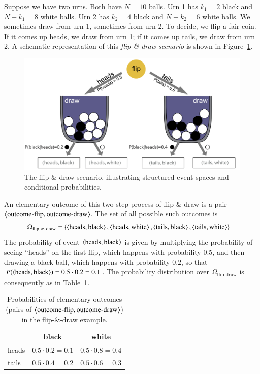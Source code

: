 \documentclass[nobib,nofonts]{tufte-handout}
\newcommand{\mult}{\ensuremath{\cdot}}
\begin{document}
Suppose we have two urns. Both have $N=10$ balls. Urn 1 has $k_1=2$ black and $N-k_1 = 8$ white
balls. Urn 2 has $k_2=4$ black and $N-k_2=6$ white balls. We sometimes draw from urn 1,
sometimes from urn 2. To decide, we flip a fair coin. If it comes up heads, we draw from urn 1;
if it comes up tails, we draw from urn 2.
A schematic representation of this \emph{flip-\&-draw scenario} is shown in Figure~\ref{fig:flip-draw}.

\begin{figure}
  \includegraphics[width=1.0\textwidth]{00-pics/05-03-flip-draw.png}
  \caption{The flip-\&-draw scenario, illustrating structured event spaces and conditional probabilities.}
  \label{fig:flip-draw}
\end{figure}

An elementary outcome of this two-step process of flip-\&-draw is a pair
$\left \langle \text{outcome-flip}, \text{outcome-draw}\right\rangle$.
The set of all possible such outcomes is
\begin{align*}
\Omega_{\text{flip-\&-draw}} & = \left\{\left \langle \text{heads}, \text{black}\right\rangle, \left \langle \text{heads},
    \text{white}\right\rangle, \left \langle \text{tails}, \text{black}\right\rangle, \left \langle \text{tails},
    \text{white}\right\rangle\right\}
\end{align*}
The probability of event $\left \langle \text{heads}, \text{black}\right\rangle$ is given by
multiplying the probability of seeing ``heads'' on the first flip, which happens with
probability $0.5$, and then drawing a black ball, which happens with probability $0.2$, so that
$P(\left \langle \text{heads}, \text{black}\right\rangle) = 0.5 \cdot 0.2 = 0.1$. The probability distribution
over $\Omega_{\text{flip-draw}}$ is consequently as in
Table~\ref{tab:flip-and-draw:probabilities}.
%
\begin{table}
  \centering
  \begin{tabular}{lcc}
    & black & white \\ \midrule
    heads & $0.5 \mult 0.2 = 0.1$  & $0.5 \mult 0.8 = 0.4$ \\
    tails & $0.5 \mult 0.4 = 0.2$  & $0.5 \mult 0.6 = 0.3$
  \end{tabular}
  \caption{Probabilities of elementary outcomes (pairs of $\left \langle \text{outcome-flip},
      \text{outcome-draw}\right\rangle$) in the flip-\&-draw example.}
  \label{tab:flip-and-draw:probabilities}
\end{table}
\end{document}
